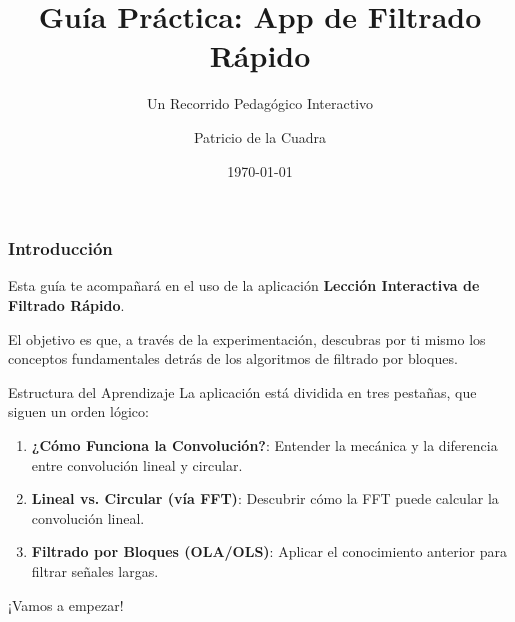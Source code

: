 \documentclass[10pt]{beamer}
\title[Guía Práctica]{Guía Práctica: App de Filtrado Rápido}
\subtitle{Un Recorrido Pedagógico Interactivo}
\author{Patricio de la Cuadra}
\institute{Señales y Sistemas \\ Pontificia Universidad Católica de Chile}
\date{\today}
\begin{document}
\begin{frame}
  \maketitle
\end{frame}

\begin{frame}
  \frametitle{Introducción}
  
  Esta guía te acompañará en el uso de la aplicación \textbf{Lección Interactiva de Filtrado Rápido}.
  
  El objetivo es que, a través de la experimentación, descubras por ti mismo los conceptos fundamentales detrás de los algoritmos de filtrado por bloques.
  
  \begin{alertblock}{Estructura del Aprendizaje}
  La aplicación está dividida en tres pestañas, que siguen un orden lógico:
  \begin{enumerate}
    \item \textbf{¿Cómo Funciona la Convolución?}: Entender la mecánica y la diferencia entre convolución lineal y circular.
    \item \textbf{Lineal vs. Circular (vía FFT)}: Descubrir cómo la FFT puede calcular la convolución lineal.
    \item \textbf{Filtrado por Bloques (OLA/OLS)}: Aplicar el conocimiento anterior para filtrar señales largas.
  \end{enumerate}
  \end{alertblock}
  
  ¡Vamos a empezar!
  
\end{frame}
\end{document}
